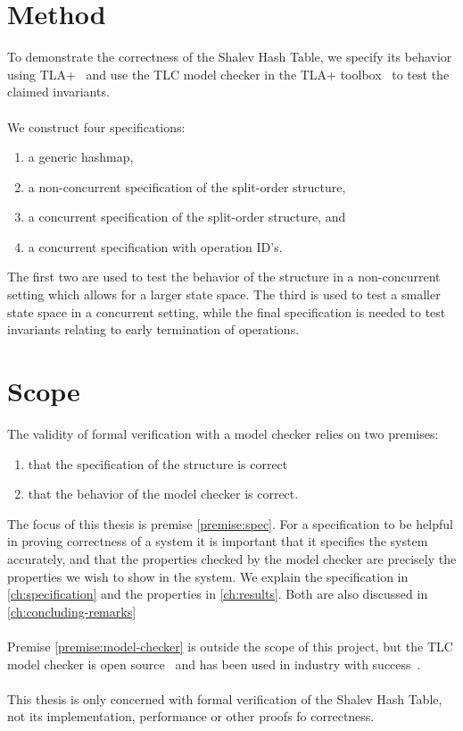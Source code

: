 \documentclass{uit-thesis}
\begin{document}
\section{Method}
To demonstrate the correctness of the Shalev Hash Table, we specify its behavior using TLA+~\cite{Lamport_specifying_2002} and use the TLC model checker in the TLA+ toolbox~\cite{TLAplus} to test the claimed invariants.
\\\\
We construct four specifications:
\begin{enumerate}
    \item a generic hashmap,
    \item a non-concurrent specification of the split-order structure,
    \item a concurrent specification of the split-order structure, and
    \item a concurrent specification with operation ID's.
\end{enumerate}
The first two are used to test the behavior of the structure in a non-concurrent setting which allows for a larger state space. The third is used to test a smaller state space in a concurrent setting, while the final specification is needed to test invariants relating to early termination of operations.

\section{Scope}
The validity of formal verification with a model checker relies on two premises:
\begin{enumerate}
    \item that the specification of the structure is correct\label{premise:spec}
    \item that the behavior of the model checker is correct.\label{premise:model-checker}
\end{enumerate}
The focus of this thesis is premise \ref{premise:spec}. For a specification to be helpful in proving correctness of a system it is important that it specifies the system accurately, and that the properties checked by the model checker are precisely the properties we wish to show in the system. We explain the specification in \autoref{ch:specification} and the properties in \autoref{ch:results}. Both are also discussed in \autoref{ch:concluding-remarks}
\\\\
Premise \ref{premise:model-checker} is outside the scope of this project, but the TLC model checker is open source~\cite{TLAplus} and has been used in industry with success~\cite{Amazon2015, Lamport-Batson2002}.
\\\\
This thesis is only concerned with formal verification of the Shalev Hash Table, not its implementation, performance or other proofs fo correctness.
\end{document}
